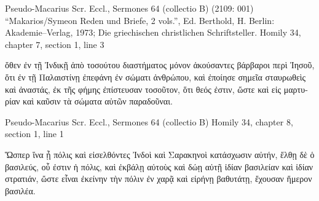 \documentclass[12pt,letterpaper,twoside,final]{memoir}
\begin{document}
\begin{greek}

Pseudo-Macarius Scr. Eccl., Sermones 64 (collectio B) (2109: 001)
“Makarios/Symeon Reden und Briefe, 2 vols.”, Ed. Berthold, H.
Berlin: Akademie–Verlag, 1973; Die griechischen christlichen Schriftsteller.
Homily 34, chapter 7, section 1, line 3

                                      ὅθεν ἐν τῇ Ἰνδικῇ ἀπὸ τοσούτου διαστήματος 
μόνον ἀκούσαντες βάρβαροι περὶ Ἰησοῦ, ὅτι ἐν τῇ Παλαιστίνῃ ἐπεφάνη ἐν 
σώματι ἀνθρώπου, καὶ ἐποίησε σημεῖα σταυρωθεὶς καὶ ἀναστάς, ἐκ τῆς φήμης 
ἐπίστευσαν τοσοῦτον, ὅτι θεός ἐστιν, ὥστε καὶ εἰς μαρτυρίαν καὶ καῦσιν τὰ 
σώματα αὐτῶν παραδοῦναι. 



Pseudo-Macarius Scr. Eccl., Sermones 64 (collectio B) 
Homily 34, chapter 8, section 1, line 1

Ὥσπερ ἵνα ᾖ πόλις καὶ εἰσελθόντες Ἰνδοὶ καὶ Σαρακηνοὶ κατάσχωσιν αὐτήν, 
ἔλθῃ δὲ ὁ βασιλεύς, οὗ ἐστιν ἡ πόλις, καὶ ἐκβάλῃ αὐτοὺς καὶ δώῃ αὐτῇ ἰδίαν 
βασιλείαν καὶ ἰδίαν στρατιάν, ὥστε εἶναι ἐκείνην τὴν πόλιν ἐν χαρᾷ καὶ εἰρήνῃ 
βαθυτάτῃ, ἔχουσαν ἥμερον βασιλέα. 

\end{greek}
\end{document}
